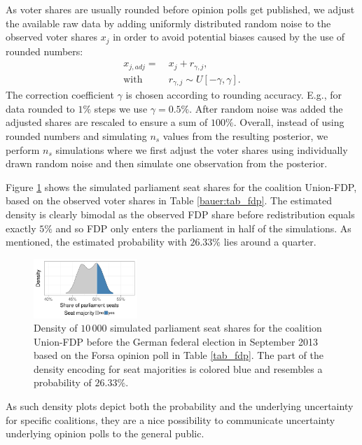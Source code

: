 \documentclass[smallcondensed]{svjour3}     %
\begin{document}
As voter shares are usually rounded before opinion polls get published,
we adjust the available raw data
by adding uniformly distributed random noise to the
observed voter shares $x_j$ in order to avoid potential biases caused 
by the use of rounded numbers:
\begin{equation}
\begin{aligned}
x_{j,adj} = \ &x_j + r_{\gamma,j}, \\
\text{with} \ \ \ \ \ &r_{\gamma,j} \sim U[-\gamma,\gamma].
\end{aligned}
\end{equation}
The correction coefficient $\gamma$ is chosen according to
rounding accuracy.
E.g., for data rounded to $1\%$ steps we use $\gamma = 0.5\%$.
After random noise was added the adjusted shares are rescaled to
ensure a sum of $100\%$. Overall, instead of using rounded numbers
and simulating $n_s$ values from the resulting posterior, we perform 
$n_s$ simulations where
we first adjust the voter shares using individually drawn random noise
and then simulate one observation from the posterior.


Figure \ref{fig:seatDist} shows the simulated
parliament seat shares for the coalition Union-FDP, based on the observed
voter shares in Table \ref{bauer:tab_fdp}. The estimated density is clearly bimodal
as the observed FDP share before redistribution equals exactly $5\%$ and
so FDP only enters the parliament in half of the simulations. As mentioned,
the estimated probability with $26.33\%$ lies around a quarter.

\begin{figure}[H]\centering
\includegraphics[width=0.35\textwidth]{figures/2013_forsa_cdufdp_lastPreelectionPoll.pdf}
\caption{Density of $10\,000$ simulated parliament seat shares for the coalition Union-FDP before the German federal election in September 2013 based on the Forsa opinion poll in Table \ref{tab_fdp}. The part of the density encoding for seat majorities is colored blue and resembles a probability of $26.33\%$.
\label{fig:seatDist}
}
\end{figure}

As such density plots depict both the probability and the underlying
uncertainty for specific coalitions, they are a nice possibility to communicate
uncertainty underlying opinion polls to the general public.
\end{document}
